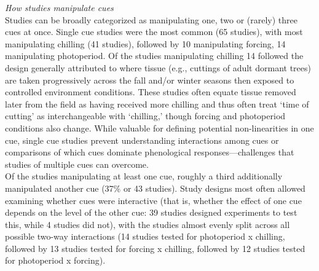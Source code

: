 \documentclass[11pt,letter]{article}
\begin{document}


\emph{How studies manipulate cues}\\
Studies can be broadly categorized as manipulating one, two or (rarely) three cues at once. Single cue studies were the most common (65 studies),  with most manipulating chilling  (41 studies), followed by 10 manipulating forcing, 14 manipulating photoperiod. Of the studies manipulating chilling 14 followed the design generally attributed to \citet{weinberger1950} where tissue (e.g., cuttings of adult dormant trees) are taken progressively across the fall and/or winter seasons then exposed to controlled environment conditions. These studies often equate tissue removed later from the field as having received more chilling and thus often treat `time of cutting' as interchangeable with `chilling,' though forcing and photoperiod conditions also change. While valuable for defining potential non-linearities in one cue, single cue studies prevent understanding interactions among cues or comparisons of which cues dominate phenological responses---challenges that studies of multiple cues can overcome. \\

Of the studies manipulating at least one cue, roughly a third additionally manipulated another cue (37\% or 43 studies). Study designs most often allowed examining whether cues were interactive (that is, whether the effect of one cue depends on the level of the other cue: 39 studies designed experiments to test this, while 4 studies did not), with the studies almost evenly split across all possible two-way interactions (14 studies tested for photoperiod x chilling, followed by 13 studies tested for forcing x chilling, followed by 12 studies tested for photoperiod x forcing). \\
\end{document}
